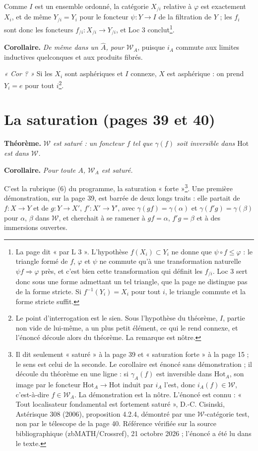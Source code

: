 \documentclass[11pt,a4paper]{article}
\begin{document}
Comme $I$ est un ensemble ordonné, la catégorie $X_{/i}$ relative à $\varphi$
est exactement $X_{i}$, et de même $Y_{/i} = Y_{i}$ pour le foncteur
$\psi : Y \to I$ de la filtration de $Y$ ; les $f_{i}$ sont donc les foncteurs
$f_{/i} : X_{/i} \to Y_{/i}$, et Loc 3 conclut\footnote{La page dit « par
L 3 ». L'hypothèse $f(X_{i}) \subset Y_{i}$ ne donne que $\psi \circ f \leq
\varphi$ : le triangle formé de $f$, $\varphi$ et $\psi$ ne commute qu'à une
transformation naturelle $\psi f \Rightarrow \varphi$ près, et c'est bien
cette transformation qui définit les $f_{/i}$. Loc 3 sert donc sous une forme
admettant un tel triangle, que la page ne distingue pas de la forme stricte.
Si $f^{-1}(Y_{i}) = X_{i}$ pour tout $i$, le triangle commute et la forme
stricte suffit.}.

\textbf{Corollaire.} \emph{De même dans un $\widehat{A}$, pour
$\mathcal{W}_{A}$}, puisque $i_{A}$ commute aux limites inductives
quelconques et aux produits fibrés.

\emph{« Cor ? »} Si les $X_{i}$ sont asphériques et $I$ connexe, $X$ est
asphérique : on prend $Y_{i} = e$ pour tout $i$\footnote{Le point
d'interrogation est le sien. Sous l'hypothèse du théorème, $I$, partie non
vide de lui-même, a un plus petit élément, ce qui le rend connexe, et
l'énoncé découle alors du théorème. La remarque est nôtre.}.

\section*{La saturation (pages 39 et 40)}

\textbf{Théorème.} \emph{$\mathcal{W}$ est saturé : un foncteur $f$ tel que
$\gamma(f)$ soit inversible dans $\mathrm{Hot}$ est dans $\mathcal{W}$.}

\textbf{Corollaire.} \emph{Pour toute $A$, $\mathcal{W}_{A}$ est saturé.}

C'est la rubrique (6) du programme, la saturation « forte »\footnote{Il dit
seulement « saturé » à la page 39 et « saturation forte » à la page 15 ; le
sens est celui de la seconde. Le corollaire est énoncé sans démonstration ; il
découle du théorème en une ligne : si $\gamma_{A}(f)$ est inversible dans
$\mathrm{Hot}_{A}$, son image par le foncteur $\mathrm{Hot}_{A} \to
\mathrm{Hot}$ induit par $i_{A}$ l'est, donc $i_{A}(f) \in \mathcal{W}$,
c'est-à-dire $f \in \mathcal{W}_{A}$. La démonstration est la nôtre.
L'énoncé est connu : « Tout localisateur fondamental est fortement saturé »,
D.-C. Cisinski, Astérisque 308 (2006), proposition 4.2.4, démontré par une $\mathcal{W}$-catégorie test, non par le télescope de la page 40. Référence vérifiée sur la source bibliographique (zbMATH/Crossref), 21 octobre 2026 ; l'énoncé a été lu dans le texte.}. Une
première démonstration, sur la page 39, est barrée de deux longs traits : elle
partait de $f : X \to Y$ et de $g : Y \to X'$, $f' : X' \to Y'$, avec
$\gamma(gf) = \gamma(\alpha)$ et $\gamma(f'g) = \gamma(\beta)$ pour
$\alpha$, $\beta$ dans $\mathcal{W}$, et cherchait à se ramener à
$gf = \alpha$, $f'g = \beta$ et à des immersions ouvertes.
\end{document}
